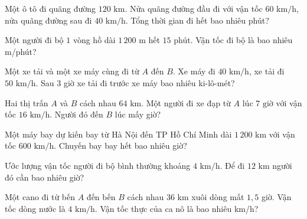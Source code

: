 \begin{ex}
  Một ô tô đi quãng đường $120\text{ km}$. Nửa quãng đường đầu đi với vận tốc $60\text{ km/h}$, nửa quãng đường sau đi $40\text{ km/h}$. Tổng thời gian đi hết bao nhiêu phút?
\end{ex}

\begin{ex}
  Một người đi bộ $1$ vòng hồ dài $1\,200\text{ m}$ hết $15$ phút. Vận tốc đi bộ là bao nhiêu m/phút?
\end{ex}

\begin{ex}
  Một xe tải và một xe máy cùng đi từ $A$ đến $B$. Xe máy đi $40\text{ km/h}$, xe tải đi $50\text{ km/h}$. Sau $3$ giờ xe tải đi trước xe máy bao nhiêu ki-lô-mét?
\end{ex}

\begin{ex}
  Hai thị trấn $A$ và $B$ cách nhau $64\text{ km}$. Một người đi xe đạp từ $A$ lúc $7\text{ giờ}$ với vận tốc $16\text{ km/h}$. Người đó đến $B$ lúc mấy giờ?
\end{ex}

\begin{ex}
  Một máy bay dự kiến bay từ Hà Nội đến TP Hồ Chí Minh dài $1\,200\text{ km}$ với vận tốc $600\text{ km/h}$. Chuyến bay bay hết bao nhiêu giờ?
\end{ex}

\begin{ex}
  Ước lượng vận tốc người đi bộ bình thường khoảng $4\text{ km/h}$. Để đi $12\text{ km}$ người đó cần bao nhiêu giờ?
\end{ex}

\begin{ex}
  Một cano đi từ bến $A$ đến bến $B$ cách nhau $36\text{ km}$ xuôi dòng mất $1{,}5$ giờ. Vận tốc dòng nước là $4\text{ km/h}$. Vận tốc thực của ca nô là bao nhiêu km/h?
\end{ex}

